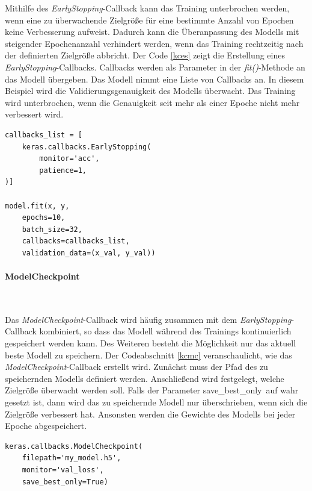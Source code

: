 Mithilfe des \textit{EarlyStopping}-Callback kann das Training unterbrochen werden, wenn eine zu überwachende Zielgröße für eine bestimmte Anzahl von Epochen keine Verbesserung aufweist. Dadurch kann die Überanpassung des Modells mit steigender Epochenanzahl verhindert werden, wenn das Training rechtzeitig nach der definierten Zielgröße abbricht. Der Code \ref{kces} zeigt die Erstellung eines \textit{EarlyStopping}-Callbacks. Callbacks werden als Parameter in der \textit{fit()}-Methode an das Modell übergeben. Das Modell nimmt eine Liste von Callbacks an. In diesem Beispiel wird die Validierungsgenauigkeit des Modells überwacht. Das Training wird unterbrochen, wenn die Genauigkeit seit mehr als einer Epoche nicht mehr verbessert wird.

\begin{lstlisting}[caption={Das frühe Stoppen des Trainings wird mit dem EarlyStopping-Callback veranlasst\cite{francois}.}, label=kces]
callbacks_list = [
	keras.callbacks.EarlyStopping(
		monitor='acc',
		patience=1,
)]

model.fit(x, y,
	epochs=10,
	batch_size=32,
	callbacks=callbacks_list,
	validation_data=(x_val, y_val))
\end{lstlisting}



\paragraph{ModelCheckpoint}
~\newline

Das \textit{ModelCheckpoint}-Callback wird häufig zusammen mit dem \textit{EarlyStopping}-Callback kombiniert, so dass das Modell während des Trainings kontinuierlich gespeichert werden kann. Des Weiteren besteht die Möglichkeit nur das aktuell beste Modell zu speichern. Der Codeabschnitt \ref{kcmc} veranschaulicht, wie das \textit{ModelCheckpoint}-Callback erstellt wird. Zunächst muss der Pfad des zu speichernden Modells definiert werden. Anschließend wird festgelegt, welche Zielgröße überwacht werden soll. Falls der Parameter \glqq save\_best\_only\grqq~auf wahr gesetzt ist, dann wird das zu speichernde Modell nur überschrieben, wenn sich die Zielgröße verbessert hat. Ansonsten werden die Gewichte des Modells bei jeder Epoche abgespeichert.

\begin{lstlisting}[caption={Mithilfe des ModelCheckpoint-Callbacks wird das beste Modell in dem Training abgespeichert\cite{francois}.}, label=kcmc]
keras.callbacks.ModelCheckpoint(
	filepath='my_model.h5',
	monitor='val_loss',
	save_best_only=True)
\end{lstlisting}



